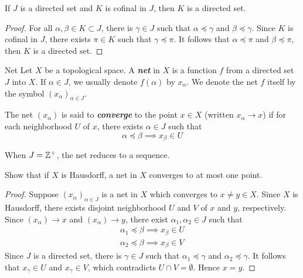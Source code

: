 \documentclass[12pt,a4paper]{article}
\begin{document}
    \begin{thm}
        If $J$ is a directed set and $K$ is cofinal in $J$, then $K$ is a directed set.
    \end{thm}
    \begin{proof}
        For all $\alpha,\beta\in K\subset J$, there is $\gamma\in J$ such that $\alpha\preceq\gamma$ and $\beta\preceq\gamma$. Since $K$ is cofinal in $J$, there exists $\pi\in K$ such that $\gamma\preceq\pi$. It follows that $\alpha\preceq\pi$ and $\beta\preceq\pi$, then $K$ is a directed set.
    \end{proof}
    \hfill

    \begin{defi}{Net}
        Let $X$ be a topological space. A \textbf{\textit{net}} in $X$ is a function $f$ from a directed set $J$ into $X$. If $\alpha\in J$, we usually denote $f(\alpha)$ by $x_\alpha$. We denote the net $f$ itself by the symbol $(x_\alpha)_{\alpha\in J}$.

        The net $(x_\alpha)$ is said to \textbf{\textit{converge}} to the point $x\in X$ (written $x_\alpha\to x$) if for each neighborhood $U$ of $x$, there exists $\alpha\in J$ such that
        $$
        \alpha\preceq\beta\implies x_\beta\in U
        $$
    \end{defi}
    \begin{remark}
        When $J=\mathbb{Z}^+$, the net reduces to a sequence.
    \end{remark}
    \hfill

    \begin{ex}
        Show that if $X$ is Hausdorff, a net in $X$ converges to at most one point.
    \end{ex}
    \begin{proof}
        Suppose $(x_\alpha)_{\alpha\in J}$ is a net in $X$ which converges to $x\neq y\in X$. Since $X$ is Hausdorff, there exists disjoint neighborhood $U$ and $V$ of $x$ and $y$, respectively. Since $(x_\alpha)\to x$ and $(x_\alpha)\to y$, there exist $\alpha_1,\alpha_2\in J$ such that
        $$
        \begin{aligned}
            \alpha_1\preceq\beta\implies x_\beta\in U\\
            \alpha_2\preceq\beta\implies x_\beta\in V
        \end{aligned}
        $$
        Since $J$ is a directed set, there is $\gamma\in J$ such that $\alpha_1\preceq\gamma$ and $\alpha_2\preceq\gamma$. It follows that $x_\gamma\in U$ and $x_\gamma\in V$, which contradicts $U\cap V=\emptyset$. Hence $x=y$.
    \end{proof}
    \hfill
\end{document}
